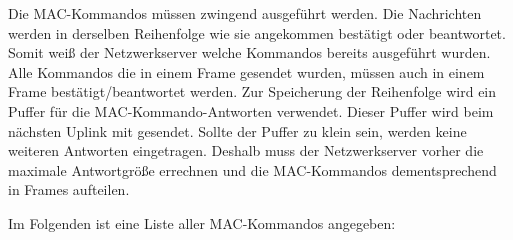 \documentclass[a4paper, 12pt]{article}
\begin{document}
                Die MAC-Kommandos müssen zwingend ausgeführt werden. Die Nachrichten werden in derselben Reihenfolge 
                wie sie angekommen bestätigt oder beantwortet. Somit weiß der Netzwerkserver welche Kommandos 
                bereits ausgeführt wurden. Alle Kommandos die in einem Frame gesendet wurden, müssen auch in einem Frame  
                bestätigt/beantwortet werden. Zur Speicherung der Reihenfolge wird ein Puffer für die 
                MAC-Kommando-Antworten verwendet. Dieser Puffer wird beim nächsten Uplink mit gesendet. 
                Sollte der Puffer zu klein sein, werden keine weiteren Antworten eingetragen. 
                Deshalb muss der Netzwerkserver vorher die maximale Antwortgröße errechnen und die 
                MAC-Kommandos dementsprechend in Frames aufteilen.\cite[S.29 ff.]{LoRaSpec}

                Im Folgenden ist eine Liste aller MAC-Kommandos angegeben:
           
\end{document}
